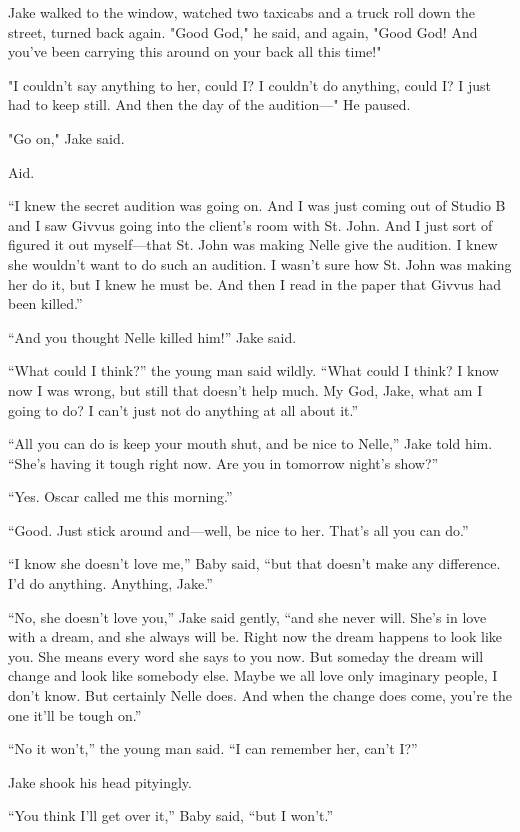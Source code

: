 \documentclass{novel}
\begin{document}
Jake walked to the window, watched two taxicabs and a truck roll down the street, turned back again. "Good God," he said, and again, "Good God! And you've been carrying this around on your back all this time!"

"I couldn't say anything to her, could I? I couldn't do anything, could I? I just had to keep still. And then the day of the audition—" He paused.

"Go on," Jake said.

Aid.

“I knew the secret audition was going on. And I was just coming out of Studio B and I saw Givvus going into the client’s room with St. John. And I just sort of figured it out myself—that St. John was making Nelle give the audition. I knew she wouldn’t want to do such an audition. I wasn’t sure how St. John was making her do it, but I knew he must be. And then I read in the paper that Givvus had been killed.”

“And you thought Nelle killed him!” Jake said.

“What could I think?” the young man said wildly. “What could I think? I know now I was wrong, but still that doesn’t help much. My God, Jake, what am I going to do? I can’t just not do anything at all about it.”

“All you can do is keep your mouth shut, and be nice to Nelle,” Jake told him. “She’s having it tough right now. Are you in tomorrow night’s show?”

“Yes. Oscar called me this morning.”

“Good. Just stick around and—well, be nice to her. That’s all you can do.”

“I know she doesn’t love me,” Baby said, “but that doesn’t make any difference. I’d do anything. Anything, Jake.”

“No, she doesn’t love you,” Jake said gently, “and she never will. She’s in love with a dream, and she always will be. Right now the dream happens to look like you. She means every word she says to you now. But someday the dream will change and look like somebody else. Maybe we all love only imaginary people, I don’t know. But certainly Nelle does. And when the change does come, you’re the one it’ll be tough on.”

“No it won’t,” the young man said. “I can remember her, can’t I?”

Jake shook his head pityingly.

“You think I’ll get over it,” Baby said, “but I won’t.”
\end{document}
